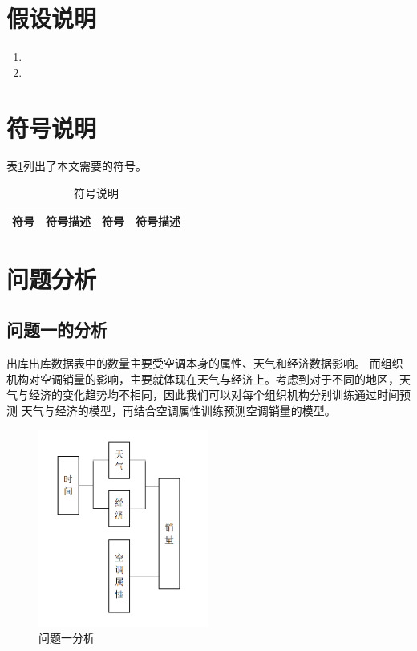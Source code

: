 \documentclass{cumcm}
\begin{document}
\section{假设说明}
\begin{enumerate}
	\item 
	\item 
	
\end{enumerate}
\section{符号说明}
表\ref{table-symbol}列出了本文需要的符号。
\begin{table}[H]
	\centering
	\caption{符号说明} \label{table-symbol}
	\begin{tabular*}{\textwidth}{cc||cc}
		\hline
		符号 & 符号描述 & 符号 & 符号描述 \\
		\hline
		
		\hline
	\end{tabular*}
\end{table}

\section{问题分析}
\subsection{问题一的分析}
出库出库数据表中的数量主要受空调本身的属性、天气和经济数据影响。
而组织机构对空调销量的影响，主要就体现在天气与经济上。考虑到对于不同的地区，天气与经济的变化趋势均不相同，因此我们可以对每个组织机构分别训练通过时间预测
天气与经济的模型，再结合空调属性训练预测空调销量的模型。
\begin{figure}[H]
	\centering
	\includegraphics*[width=0.5\textwidth]{img_backup//q1_flowchart.png}
	\caption{问题一分析}
	\label{fig:q1_flowchart}
\end{figure}
\end{document}
